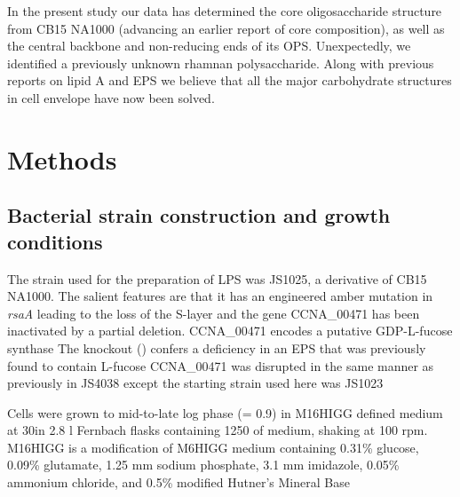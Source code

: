 In the present study our data has determined the core oligosaccharide structure from
\caulobacter CB15 NA1000 (advancing an earlier report of core
composition), as well as the central backbone and
non-reducing ends of its \ac{OPS}. Unexpectedly, we identified a previously
unknown rhamnan polysaccharide. Along with previous reports on lipid
A and \ac{EPS} we believe
that all the major carbohydrate structures in \caulobacter cell envelope have
now been solved.

\section{Methods} %
\label{sec:lps_methods}

	\subsection{Bacterial strain construction and growth conditions} %
	\label{sub:bacterial_strain_construction_and_growth_conditions}

  The strain used for the preparation of \ac{LPS} was JS1025, a derivative of \caulobacter CB15
  NA1000. The salient features are that it has an engineered amber mutation in \textit{rsaA} leading
  to the loss of the \ac{S-layer} and the gene CCNA\_00471 has been inactivated by a partial
  deletion. CCNA\_00471 encodes a putative GDP-L-fucose synthase The
  knockout () confers a deficiency in an \ac{EPS} that was previously found to contain
  L-fucose CCNA\_00471 was disrupted in the same manner as previously in
  JS4038 except the starting strain used here was
  JS1023
		
  Cells were grown to mid-to-late log phase (\od = 0.9) in M16HIGG defined medium at 30\cel in 2.8
  \si{\litre} Fernbach flasks containing 1250 \millilitre of medium, shaking at 100 rpm. M16HIGG is
  a modification of M6HIGG medium containing 0.31\% glucose, 0.09\%
  glutamate, 1.25 \si{\milli\meter} sodium phosphate, 3.1 \si{\milli\meter} imidazole, 0.05\%
  ammonium chloride, and 0.5\% modified Hutner's Mineral Base

